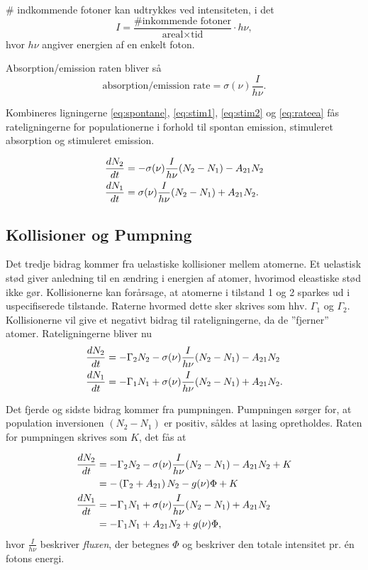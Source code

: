 \# indkommende fotoner kan udtrykkes ved intensiteten, i det 
\begin{equation}
I = \frac{\text{\# inkommende fotoner}}{\text{areal}\times \text{tid}}\cdot h\nu,
\label{eq:intensitetfoton}
\end{equation}
hvor $h\nu$ angiver energien af en enkelt foton. 

Absorption/emission raten bliver så 
\begin{equation}
\text{absorption/emission rate} = \sigma(\nu)\frac{I}{h\nu}.
\label{eq:rateea}
\end{equation}

Kombineres ligningerne \ref{eq:spontane}, \ref{eq:stim1}, \ref{eq:stim2} og \ref{eq:rateea} fås rateligningerne for populationerne i forhold til spontan emission, stimuleret absorption og stimuleret emission. 

\begin{align}
{d{N_2} \over d{t}} &= - \sigma(\nu)\frac{I}{h\nu}(N_2-N_1)-A_{21}N_2\\
{d{N_1} \over d{t}} &= \sigma(\nu)\frac{I}{h\nu}(N_2-N_1) + A_{21}N_2. 
\end{align}

\subsection{Kollisioner og Pumpning}
Det tredje bidrag kommer fra uelastiske kollisioner mellem atomerne. Et uelastisk stød giver anledning til en ændring i energien af atomer, hvorimod eleastiske stød ikke gør. Kollisionerne kan forårsage, at atomerne i tilstand 1 og 2 sparkes ud i uspecifiserede tilstande. Raterne hvormed dette sker skrives som hhv. $\Gamma_1$ og $\Gamma_2$. Kollisionerne vil give et negativt bidrag til rateligningerne, da de ''fjerner'' atomer. Rateligningerne bliver nu 
\begin{align}
{d{N_2} \over d{t}} &= -\Gamma_2 N_2- \sigma(\nu)\frac{I}{h\nu}(N_2-N_1)-A_{21}N_2\\
{d{N_1} \over d{t}} &= -\Gamma_1N_1 + \sigma(\nu)\frac{I}{h\nu}(N_2-N_1) + A_{21}N_2. 
\end{align}

Det fjerde og sidste bidrag kommer fra pumpningen. Pumpningen sørger for, at population inversionen $(N_2-N_1)$ er positiv, såldes at lasing opretholdes.  Raten for pumpningen skrives som $K$, det fås at

\begin{align}
{d{N_2} \over d{t}} &= -\Gamma_2 N_2- \sigma(\nu)\frac{I}{h\nu}(N_2-N_1)-A_{21}N_2 + K\\ &= -\left( \Gamma_2 + A_{21}\right)N_2 -g(\nu)\Phi+K\\
{d{N_1} \over d{t}} &= -\Gamma_1N_1 + \sigma(\nu)\frac{I}{h\nu}(N_2-N_1) + A_{21}N_2\\ &= -\Gamma_1N_1 + A_{21}N_2 + g(\nu)\Phi, 
\end{align}
hvor $\frac{I}{h\nu}$ beskriver \emph{fluxen}, der betegnes $\Phi$ og beskriver den totale intensitet pr. én fotons energi. 

